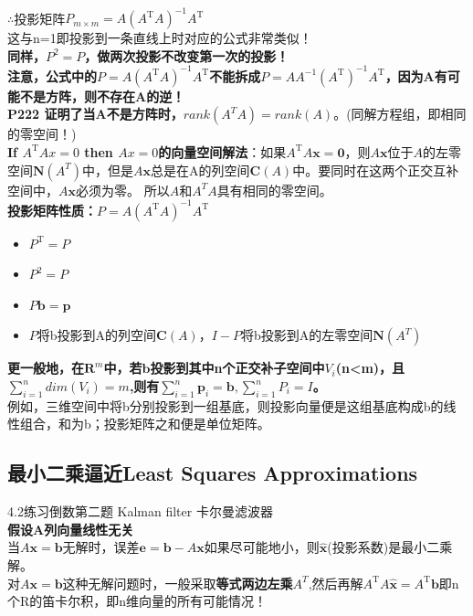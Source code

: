    \\
    $\therefore$投影矩阵$P_{m\times m}=A\left(A^{\mathrm{T}} A\right)^{-1} A^{\mathrm{T}}$
    \\
    这与n=1即投影到一条直线上时对应的公式非常类似！\\
    \textbf{同样，$P^2=P$，做两次投影不改变第一次的投影！}\\
    \textbf{注意，公式中的$P=A\left(A^{\mathrm{T}} A\right)^{-1} A^{\mathrm{T}}$不能拆成$P=A A^{-1}\left(A^{\mathrm{T}}\right)^{-1} A^{\mathrm{T}}$，因为A有可能不是方阵，则不存在A的逆！}
    \\
    \textbf{P222 证明了当A不是方阵时，$rank(A^T A)=rank(A)$}。(同解方程组，即相同的零空间！) \\
    \textbf{If $A^{\mathrm{T}} A x=0$ then $A x=0$的向量空间解法}：如果$A^{\mathrm{T}} A \boldsymbol{x}=\mathbf{0}$，则$A\bm{x}$位于$A$的左零空间$\bm{N}(A^T)$中，但是$A\bm{x}$总是在A的列空间$\bm{C}(A)$中。要同时在这两个正交互补空间中，$A\bm{x}$必须为零。 所以$A$和$A^T A$具有相同的零空间。
    \\
    \textbf{投影矩阵性质：$P=A\left(A^{\mathrm{T}} A\right)^{-1} A^{\mathrm{T}}$}
    \begin{itemize}
        \item $P^{\mathrm{T}}=P$
        \item $P^{2}=P$
        \item $P \boldsymbol{b}=\boldsymbol{p}$
        \item $P$将b投影到A的列空间$\bm{C}(A)$，$I-P$将b投影到A的左零空间$\bm{N}(A^T)$
    \end{itemize}
    \textbf{更一般地，在$\bm{R}^m$中，若$\bm{b}$投影到其中n个正交补子空间中$V_i$(n<m)，且$\sum_{i=1}^{n}dim(V_i)=m$,则有$\sum_{i=1}^{n}\bm{p}_i=\bm{b}, \sum_{i=1}^{n}P_i=I$。}
    \\
    例如，三维空间中将b分别投影到一组基底，则投影向量便是这组基底构成b的线性组合，和为b；投影矩阵之和便是单位矩阵。

    \subsection{最小二乘逼近Least Squares Approximations}
    4.2练习倒数第二题 Kalman filter 卡尔曼滤波器\\
    \textbf{假设A列向量线性无关}\\
    当$A \boldsymbol{x}=\bm{b}$无解时，误差$\bm{e}=\bm{b}-A \bm{x}$如果尽可能地小，则$\hat{\bm{x}}$(投影系数)是最小二乘解。
    \\
    对$A \boldsymbol{x}=\bm{b}$这种无解问题时，一般采取\textbf{等式两边左乘$A^T$},然后再解$A^{\mathrm{T}} A \widehat{\boldsymbol{x}}=A^{\mathrm{T}} \boldsymbol{b}$即n个R的笛卡尔积，即n维向量的所有可能情况！
